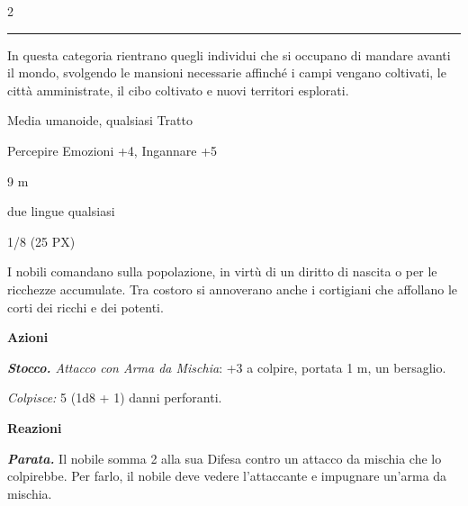 \begin{multicols}{2}
{%




\noindent\rule{\linewidth}{2pt} \hypertarget{Cittadini}{}

In questa categoria rientrano quegli individui che si occupano di mandare avanti il mondo, svolgendo le mansioni necessarie affinché i campi vengano coltivati, le città amministrate, il cibo coltivato e
nuovi territori esplorati.

\begin{description}[noitemsep, topsep=0pt, parsep=0pt, partopsep=0pt, itemsep=1pt, leftmargin=2.35cm,  labelwidth=2.2cm, itemindent=0cm, listparindent=0pt] %
\setlength{\baselineskip}{10pt}
\item[\textbf{Taglia/Tipo}] Media umanoide, qualsiasi Tratto
\item[\textbf{Caratt.}] 
\item[\textbf{Punti Ferita}] 
\item[\textbf{Comp.}] Percepire Emozioni +4, Ingannare +5
\item[\textbf{Tiri Salvez.}] 
\item[\textbf{Movimento}] 9 m
\item[\textbf{Linguaggi}] due lingue qualsiasi
\item[\textbf{Sfida}] 1/8 (25 PX)
\end{description}
\smallskip

I nobili comandano sulla popolazione, in virtù di un diritto di nascita o per le ricchezze accumulate. Tra costoro si annoverano anche i cortigiani che affollano le corti dei ricchi e dei potenti.

\textbf{Azioni}

\emph{\textbf{Stocco.} Attacco con Arma da Mischia}: +3 a colpire, portata 1 m, un bersaglio.

\emph{Colpisce:} 5 (1d8 + 1) danni perforanti.

\textbf{Reazioni}

\emph{\textbf{Parata.}} Il nobile somma 2 alla sua Difesa contro un attacco da mischia che lo colpirebbe. Per farlo, il nobile deve vedere l'attaccante e impugnare un'arma da mischia.

}
\end{multicols}
